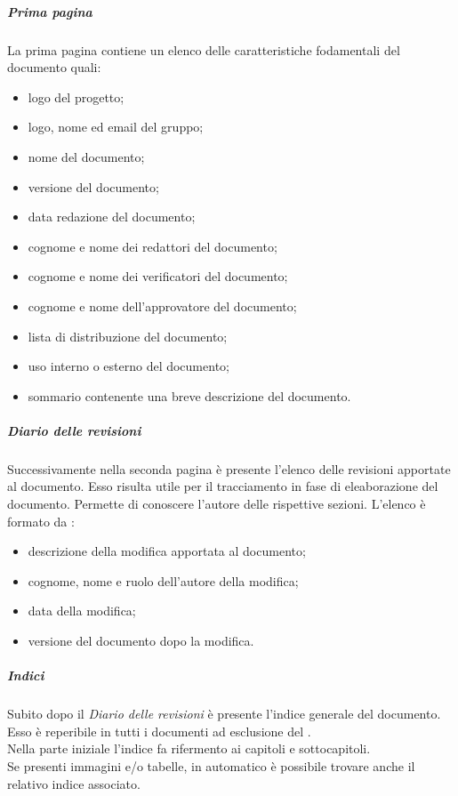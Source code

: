 				\subparagraph{Prima pagina}
				La prima pagina contiene un elenco delle caratteristiche fodamentali del documento quali:
				\begin{itemize}
					\item logo del progetto;
					\item logo, nome ed email del gruppo; 
					\item nome del documento;
					\item versione del documento;
					\item data redazione del documento;
					\item cognome e nome dei redattori del documento;
					\item cognome e nome dei verificatori del documento;
					\item cognome e nome dell'approvatore del documento;
					\item lista di distribuzione del documento;
					\item uso interno o esterno del documento;
					\item sommario contenente una breve descrizione del documento.
				\end{itemize}
			
				\subparagraph{Diario delle revisioni}
				Successivamente nella seconda pagina è presente l'elenco delle revisioni apportate al documento. Esso risulta utile per il tracciamento in fase di eleaborazione del documento. Permette di conoscere l'autore delle rispettive sezioni. L'elenco è formato da :
				\begin{itemize}
					\item descrizione della modifica apportata al documento;
					\item cognome, nome e ruolo dell'autore della modifica;
					\item data della modifica;
					\item versione del documento dopo la modifica.
				\end{itemize}

				\subparagraph{Indici}
				Subito dopo il \emph{Diario delle revisioni} è presente l'indice generale del documento. Esso è reperibile in tutti i documenti ad esclusione del \docGlossary.\\
				Nella parte iniziale l'indice fa rifermento ai capitoli e sottocapitoli.\\
				Se presenti immagini e/o tabelle, in automatico è possibile trovare anche il relativo indice associato.
			
